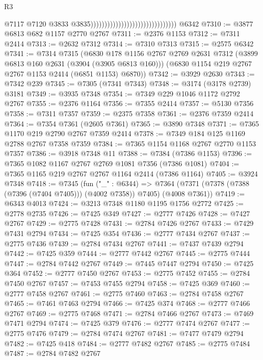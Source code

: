 \begin{lexlean}{R3}
\begin{coremodule}
                                                                  @7117
                                                                  @7120
                                                                  @3833
                                                                  @3835)))))))))))))))))))))))))))))))
    @6342
@7310 := @3877 @6813 @682 @1157 @2770 @2767
@7311 := @2376 @1153
@7312 := @7311 @2414
@7313 := @2632 @7312
@7314 := @7310 @7313
@7315 := @2575 @6342
@7341 := @7314
    @7315
    (@6830
      @178
      @1156
      @2767
      @2769
      @2631
      @7312
      (@3899 @6813 @160 @2631 (@3904 (@3905 @6813 @160)))
      (@6830 @1154 @219 @2767 @2767 @1153 @2414 (@6851 @1153) @6870))
@7342 := @3929 @2630
@7343 := @7342 @239
@7345 := @7305 (@7341 @7343)
@7348 := @3174 (@3178 @2739) @3181
@7349 := @3935 @7348
@7354 := @7349 @229 @1046 @1172 @2792 @2767
@7355 := @2376 @1164
@7356 := @7355 @2414
@7357 := @5130 @7356
@7358 := @7311 @7357
@7359 := @2375 @7358
@7361 := @2376 @7359 @2414
@7364 := @7354 @7361 (@2605 @7361)
@7365 := @3890 @7348
@7371 := @7365 @1170 @219 @2790 @2767 @7359 @2414
@7378 := @7349 @184 @125 @1169 @2788 @2767 @7358 @7359
@7384 := @7365 @1154 @1168 @2767 @2770 @1153 @7357
@7386 := @3918 @7348 @11
@7388 := @7384 (@7386 @1153)
@7396 := @7365 @1082 @1167 @2767 @2769 @1081 @7356 (@7386 @1081)
@7404 := @7365 @1165 @219 @2767 @2767 @1164 @2414 (@7386 @1164)
@7405 := @3924 @7348
@7418 := @7345
    (fun ("_" : @6344) =>
    @7364 (@7371 (@7378 (@7388 (@7396 (@7404 @7405))) (@4002 @7358)) @7405) (@4008 @7361))
@7419 := @6343 @4013
@7424 := @3213 @7348 @1180 @1195 @1756 @2772
@7425 := @2778 @2735
@7426 := @7425 @349
@7427 := @2777 @7426
@7428 := @7427 @2767
@7429 := @2775 @7428
@7431 := @2784 @7426 @2767
@7433 := @7429 @7431 @2794
@7434 := @7425 @354
@7436 := @2777 @7434 @2767
@7437 := @2775 @7436
@7439 := @2784 @7434 @2767
@7441 := @7437 @7439 @2794
@7442 := @7425 @359
@7444 := @2777 @7442 @2767
@7445 := @2775 @7444
@7447 := @2784 @7442 @2767
@7449 := @7445 @7447 @2794
@7450 := @7425 @364
@7452 := @2777 @7450 @2767
@7453 := @2775 @7452
@7455 := @2784 @7450 @2767
@7457 := @7453 @7455 @2794
@7458 := @7425 @369
@7460 := @2777 @7458 @2767
@7461 := @2775 @7460
@7463 := @2784 @7458 @2767
@7465 := @7461 @7463 @2794
@7466 := @7425 @374
@7468 := @2777 @7466 @2767
@7469 := @2775 @7468
@7471 := @2784 @7466 @2767
@7473 := @7469 @7471 @2794
@7474 := @7425 @379
@7476 := @2777 @7474 @2767
@7477 := @2775 @7476
@7479 := @2784 @7474 @2767
@7481 := @7477 @7479 @2794
@7482 := @7425 @418
@7484 := @2777 @7482 @2767
@7485 := @2775 @7484
@7487 := @2784 @7482 @2767

\end{coremodule}
\end{lexlean}
